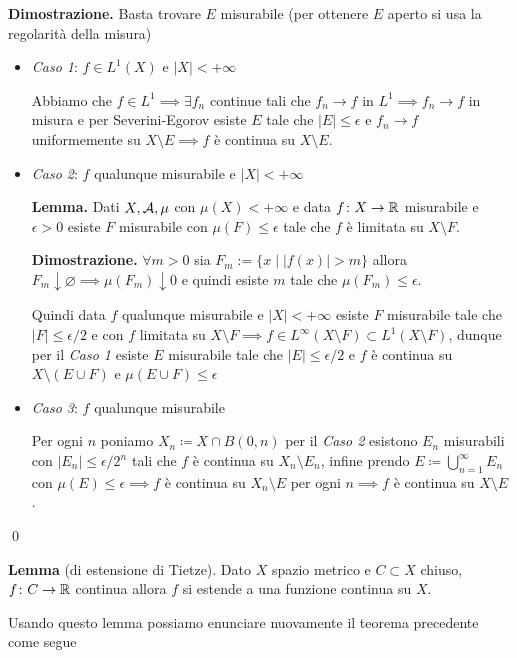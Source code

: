 \textbf{Dimostrazione.}
Basta trovare $E$ misurabile (per ottenere $E$ aperto si usa la regolarità della misura)
\begin{itemize}
	\item \textit{Caso 1}:
		$f \in L^1(X)$ e $|X| < +\infty$

		Abbiamo che $f \in L^1 \implies \exists f_n$ continue tali che $f_n \to f$ in $L^1 \implies f_n \to f$ in misura e per Severini-Egorov esiste $E$ tale che $|E| \leq \epsilon$ e $f_n \to f$ uniformemente su $X \setminus E \implies f$ è continua su $X \setminus E$.

	\item \textit{Caso 2}:
		$f$ qualunque misurabile e $|X| < +\infty$

		\textbf{Lemma.}
		Dati $X, \mathcal{A}, \mu$ con $\mu(X) < +\infty$ e data $f \colon X \to \mathbb R$ misurabile e $\epsilon > 0$ esiste $F$ misurabile con $\mu(F) \leq \epsilon$ tale che $f$ è limitata su $X \setminus F$.
		
		\textbf{Dimostrazione.}
		$\forall m > 0$ sia $F_m := \{ x \mid |f(x)| > m \}$ allora $F_m \downarrow \varnothing \implies \mu(F_m) \downarrow 0$ e quindi esiste $m$ tale che $\mu(F_m) \leq \epsilon$.

		Quindi data $f$ qualunque misurabile e $|X| < +\infty$ esiste $F$ misurabile tale che $|F| \leq \epsilon / 2$ e con $f$ limitata su $X \setminus F \implies f \in L^\infty(X \setminus F) \subset L^1(X \setminus F)$, dunque per il \textit{Caso 1} esiste $E$ misurabile tale che $|E| \leq \epsilon / 2$ e $f$ è continua su $X \setminus (E \cup F)$ e $\mu(E \cup F) \leq \epsilon$

	\item \textit{Caso 3}:
		$f$ qualunque misurabile

		Per ogni $n$ poniamo $X_n \coloneqq X \cap B(0, n)$ per il \textit{Caso 2} esistono $E_n$ misurabili con $|E_n| \leq \epsilon / 2^n$ tali che $f$ è continua su $X_n \setminus E_n$, infine prendo $E \coloneqq \bigcup_{n=1}^\infty E_n$ con $\mu(E) \leq \epsilon \implies f$ è continua su $X_n \setminus E$ per ogni $n \implies f$ è continua su $X \setminus E$. 

\end{itemize}
\qed

\textbf{Lemma} (di estensione di Tietze). Dato $X$ spazio metrico e $C \subset X$ chiuso, $f \colon C \to \mathbb R$ continua allora $f$ si estende a una funzione continua su $X$.

Usando questo lemma possiamo enunciare nuovamente il teorema precedente come segue

